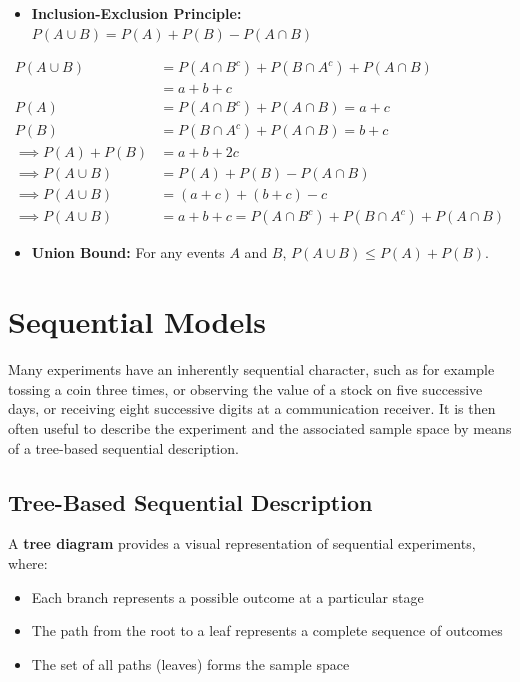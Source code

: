 \begin{itemize}
\begin{itemize}
    \item \textbf{Inclusion-Exclusion Principle:}   \(P(A \cup B) = P(A) + P(B) - P(A \cap B)\) 
\end{itemize}
\begin{proofboxbreak}{}
    \begin{align}
     P(A \cup B) &= P(A \cap B^{c}) + P(B \cap A^{c}) + P(A \cap B) \\ 
      &= a + b + c \\
        P(A) &= P(A \cap B^{c}) + P(A \cap B) = a + c \\
        P(B) &= P(B \cap A^{c}) + P(A \cap B) = b + c \\
        \implies P(A) + P(B) &= a + b + 2c \\
        \implies P(A \cup B) &= P(A) + P(B) - P(A \cap B) \\
        \implies P(A \cup B) &= (a + c) + (b + c) - c \\
        \implies P(A \cup B) &= a + b + c = P(A \cap B^{c}) + P(B \cap A^{c}) + P(A \cap B)
    \end{align}
\end{proofboxbreak}

\begin{itemize}
    \item \textbf{Union Bound:} For any events \(A\) and \(B\), \(P(A \cup B) \leq P(A) + P(B)\).
\end{itemize}

\section{Sequential Models}

Many experiments have an inherently sequential character, such as for example tossing a coin three times, or observing the value of a stock on five successive days, or receiving eight successive digits at a communication receiver. It is then often useful to describe the experiment and the associated sample space by means of a tree-based sequential description.

\subsection{Tree-Based Sequential Description}

A \textbf{tree diagram} provides a visual representation of sequential experiments, where:
\begin{itemize}
    \item Each branch represents a possible outcome at a particular stage
    \item The path from the root to a leaf represents a complete sequence of outcomes
    \item The set of all paths (leaves) forms the sample space
\end{itemize}



\end{itemize}
